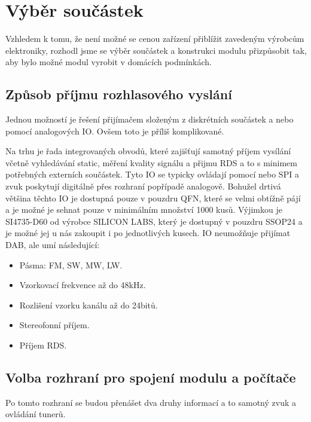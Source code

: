 \section{Výběr součástek}
\label{sec:Vyber}
Vzhledem k tomu, že není možné se cenou zařízení přiblížit zavedeným výrobcům elektroniky, rozhodl jsme se výběr součástek a konstrukci modulu přizpůsobit tak, aby bylo možné modul vyrobit v domácích podmínkách.

 
\subsection{Způsob příjmu rozhlasového vyslání}
Jednou možností je řešení přijímačem složeným z diskrétních součástek a nebo pomocí analogových IO. Ovšem toto je příliš komplikované.

Na trhu je řada integrovaných obvodů, které zajišťují samotný příjem vysílání včetně vyhledávání static, měření kvality signálu a přijmu RDS a to s minimem potřebných externích součástek. Tyto IO se typicky ovládají pomocí \iic nebo SPI a zvuk poskytují digitálně přes rozhraní \iis popřípadě analogově. Bohužel drtivá většina těchto IO je dostupná pouze v pouzdru QFN, které se velmi obtížně pájí a je možné je sehnat pouze v minimálním množství 1000 kusů. Výjimkou je SI4735-D60 od výrobce SILICON LABS, který je dostupný v pouzdru SSOP24 a je možné jej u nás zakoupit i po jednotlivých kusech. IO neumožňuje přijímat DAB, ale umí následující:
\begin{itemize}
\item{Pásma: FM, SW, MW, LW.}
\item{Vzorkovací frekvence až do 48kHz.}
\item{Rozlišení vzorku kanálu až do 24bitů.}
\item{Stereofonní příjem.}
\item{Příjem RDS.}
\end{itemize}

\subsection{Volba rozhraní pro spojení modulu a počítače}
Po tomto rozhraní se budou přenášet dva druhy informací a to samotný zvuk a ovládání tunerů.

